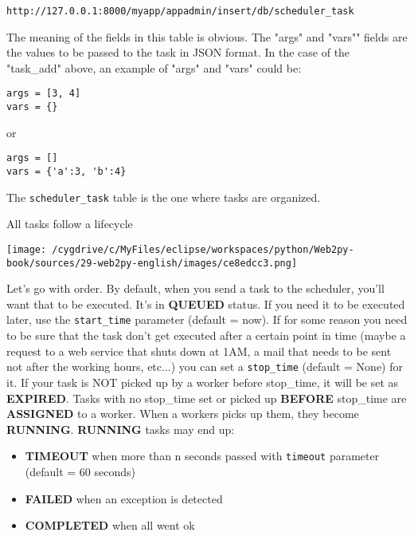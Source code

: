 \documentclass[justified,sixbynine,notoc]{tufte-book}
\def\ft{\small\tt}
\begin{document}
\begin{fullwidth}
\begin{lstlisting}[keywords={}]
http://127.0.0.1:8000/myapp/appadmin/insert/db/scheduler_task
\end{lstlisting}

The meaning of the fields in this table is obvious. The "args" and "vars"" fields are the values to be passed to the task in JSON format. In the case of the "task\_add" above, an example of "args" and "vars" could be:

\begin{lstlisting}
args = [3, 4]
vars = {}
\end{lstlisting}
\noindent or

\begin{lstlisting}
args = []
vars = {'a':3, 'b':4}
\end{lstlisting}

The {\ft scheduler\_task} table is the one where tasks are organized.

All tasks follow a lifecycle


\goodbreak\begin{center}\texttt{[image: /cygdrive/c/MyFiles/eclipse/workspaces/python/Web2py-book/sources/29-web2py-english/images/ce8edcc3.png]}\end{center}


Let's go with order. By default, when you send a task to the scheduler, you'll want that to be executed. It's in {\bf QUEUED} status.
If you need it to be executed later, use the {\ft start\_time} parameter (default = now).
If for some reason you need to be sure that the task don't get executed after a certain point in time (maybe a request to a web service
that shuts down at 1AM, a mail that needs to be sent not after the working hours, etc...) you can set a {\ft stop\_time} (default = None) for it.
If your task is NOT picked up by a worker before stop\_time, it will be set as {\bf EXPIRED}.
Tasks with no stop\_time set or picked up {\bf BEFORE} stop\_time are {\bf ASSIGNED} to a worker. When a workers picks up them, they become {\bf RUNNING}.
{\bf RUNNING} tasks may end up:
\begin{itemize}
\item {\bf TIMEOUT} when more than n seconds passed with {\ft timeout} parameter (default = 60 seconds)

\item {\bf FAILED} when an exception is detected

\item {\bf COMPLETED} when all went ok
\end{itemize}


\end{fullwidth}
\end{document}
